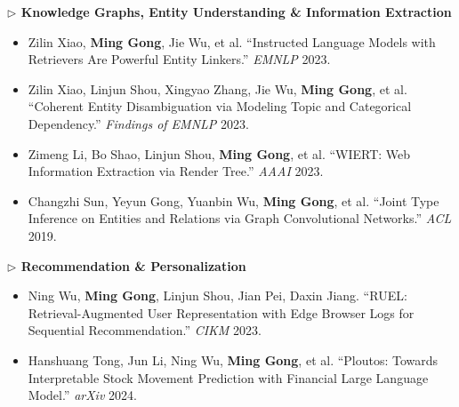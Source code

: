 \documentclass[10.5pt,letterpaper]{article}
\begin{document}
\noindent\textcolor{blue!60!black}{\textbf{$\triangleright$ Knowledge Graphs, Entity Understanding \& Information Extraction}}
\begin{itemize}
  \item Zilin Xiao, \textbf{Ming Gong}, Jie Wu, et al. ``Instructed Language Models with Retrievers Are Powerful Entity Linkers.'' \textit{EMNLP} 2023.
  \item Zilin Xiao, Linjun Shou, Xingyao Zhang, Jie Wu, \textbf{Ming Gong}, et al. ``Coherent Entity Disambiguation via Modeling Topic and Categorical Dependency.'' \textit{Findings of EMNLP} 2023.
  \item Zimeng Li, Bo Shao, Linjun Shou, \textbf{Ming Gong}, et al. ``WIERT: Web Information Extraction via Render Tree.'' \textit{AAAI} 2023.
  \item Changzhi Sun, Yeyun Gong, Yuanbin Wu, \textbf{Ming Gong}, et al. ``Joint Type Inference on Entities and Relations via Graph Convolutional Networks.'' \textit{ACL} 2019.
\end{itemize}

\noindent\textcolor{blue!60!black}{\textbf{$\triangleright$ Recommendation \& Personalization}}
\begin{itemize}
  \item Ning Wu, \textbf{Ming Gong}, Linjun Shou, Jian Pei, Daxin Jiang. ``RUEL: Retrieval-Augmented User Representation with Edge Browser Logs for Sequential Recommendation.'' \textit{CIKM} 2023.
  \item Hanshuang Tong, Jun Li, Ning Wu, \textbf{Ming Gong}, et al. ``Ploutos: Towards Interpretable Stock Movement Prediction with Financial Large Language Model.'' \textit{arXiv} 2024.
\end{itemize}

\end{document}
